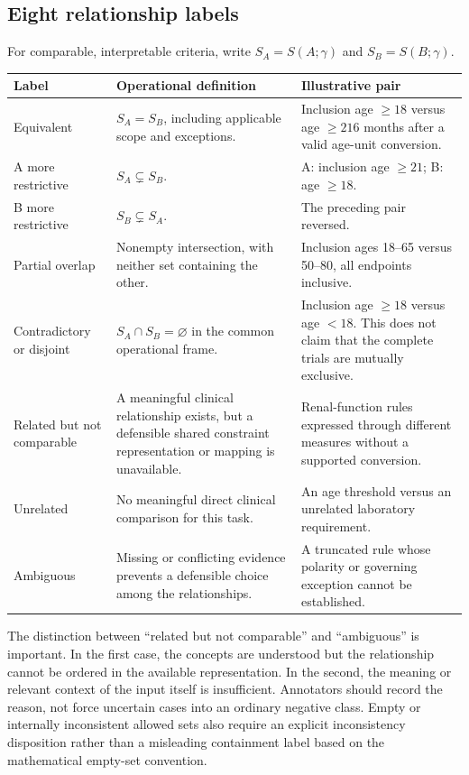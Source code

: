 \documentclass[10pt,letterpaper]{article}
\begin{document}
\subsection{Eight relationship labels}
For comparable, interpretable criteria, write $S_A=S(A;\gamma)$ and
$S_B=S(B;\gamma)$.
\begin{longtable}{L{.23\linewidth}L{.39\linewidth}L{.29\linewidth}}
\toprule Label & Operational definition & Illustrative pair\\\midrule
\endhead
Equivalent & $S_A=S_B$, including applicable scope and exceptions. & Inclusion age $\geq18$ versus age $\geq216$ months after a valid age-unit conversion.\\
A more restrictive & $S_A\subsetneq S_B$. & A: inclusion age $\geq21$; B: age $\geq18$.\\
B more restrictive & $S_B\subsetneq S_A$. & The preceding pair reversed.\\
Partial overlap & Nonempty intersection, with neither set containing the other. & Inclusion ages 18--65 versus 50--80, all endpoints inclusive.\\
Contradictory or disjoint & $S_A\cap S_B=\varnothing$ in the common operational frame. & Inclusion age $\geq18$ versus age $<18$. This does not claim that the complete trials are mutually exclusive.\\
Related but not comparable & A meaningful clinical relationship exists, but a defensible shared constraint representation or mapping is unavailable. & Renal-function rules expressed through different measures without a supported conversion.\\
Unrelated & No meaningful direct clinical comparison for this task. & An age threshold versus an unrelated laboratory requirement.\\
Ambiguous & Missing or conflicting evidence prevents a defensible choice among the relationships. & A truncated rule whose polarity or governing exception cannot be established.\\\bottomrule
\end{longtable}

The distinction between ``related but not comparable'' and ``ambiguous'' is
important. In the first case, the concepts are understood but the relationship
cannot be ordered in the available representation. In the second, the
meaning or relevant context of the input itself is insufficient. Annotators
should record the reason, not force uncertain cases into an ordinary
negative class. Empty or internally inconsistent allowed sets also require
an explicit inconsistency disposition rather than a misleading containment
label based on the mathematical empty-set convention.
\end{document}
